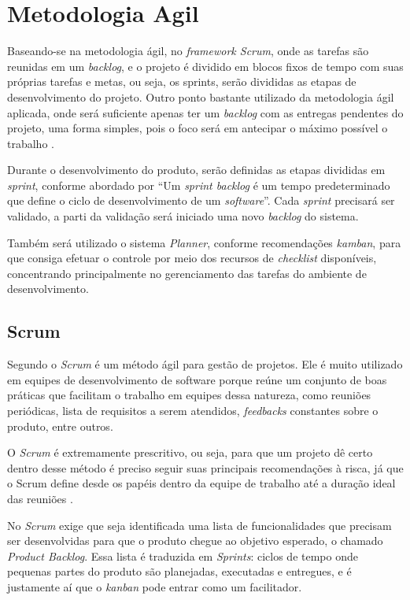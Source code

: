     
\section{Metodologia Agil}

    Baseando-se na metodologia ágil, no \textit{framework Scrum}, onde as tarefas são reunidas em um  \textit{backlog}, e o projeto é dividido em blocos fixos de tempo com suas próprias tarefas e metas, ou seja, os sprints, serão divididas as etapas de desenvolvimento do projeto. Outro ponto bastante utilizado da metodologia ágil aplicada, onde será suficiente apenas ter um \textit{backlog} com as entregas pendentes do projeto, uma forma simples, pois o foco será em antecipar o máximo possível o trabalho \cite{juliana}.
    
    Durante o desenvolvimento do produto, serão definidas as etapas divididas em \textit{sprint}, conforme abordado por  “Um \textit{sprint backlog} é um tempo predeterminado que define o ciclo de desenvolvimento de um  \textit{software}”. Cada \textit{sprint} precisará ser validado, a parti da validação será iniciado uma novo \textit{backlog} do sistema. 
    
    Também será utilizado o sistema \textit{Planner}, conforme recomendações \textit{kamban}, para que consiga efetuar o controle por meio dos recursos de \textit{checklist} disponíveis, concentrando principalmente no gerenciamento das tarefas do ambiente de desenvolvimento.
        
        
\subsection{Scrum}

     Segundo  o \textit{Scrum} é um método ágil para gestão de projetos. Ele é muito utilizado em equipes de desenvolvimento de software porque reúne um conjunto de boas práticas que facilitam o trabalho em equipes dessa natureza, como reuniões periódicas, lista de requisitos a serem atendidos, \textit{feedbacks} constantes sobre o produto, entre outros.
    
    O \textit{Scrum} é extremamente prescritivo, ou seja, para que um projeto dê certo dentro desse método é preciso seguir suas principais recomendações à risca, já que o Scrum define desde os papéis dentro da equipe de trabalho até a duração ideal das reuniões \cite{kamban}.
    
    No \textit{Scrum} exige que seja identificada uma lista de funcionalidades que precisam ser desenvolvidas para que o produto chegue ao objetivo esperado, o chamado \textit{Product Backlog}. Essa lista é traduzida em \textit{Sprints}: ciclos de tempo onde pequenas partes do produto são planejadas, executadas e entregues, e é justamente aí que o \textit{kanban} pode entrar como um facilitador.
    
